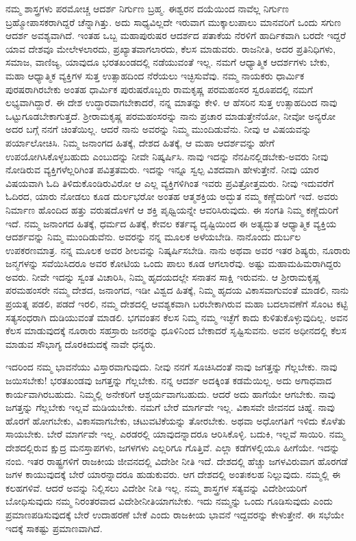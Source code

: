 ನಮ್ಮ ಶಾಸ್ತ್ರಗಳು ಪರಮೋಚ್ಚ ಆದರ್ಶ ನಿರ್ಗುಣ ಬ್ರಹ್ಮ. ಈಶ್ವರನ ದಯೆಯಿಂದ ನಾವೆಲ್ಲ ನಿರ್ಗುಣ ಬ್ರಹ್ಮೋಪಾಸಕರಾಗಿದ್ದರೆ ಚೆನ್ನಾಗಿತ್ತು. ಅದು ಸಾಧ್ಯವಿಲ್ಲದೇ ಇರುವಾಗ ಮುಕ್ಕಾಲುಪಾಲು ಮಾನವರಿಗೆ ಒಂದು ಸಗುಣ ಆದರ್ಶ ಅವಶ್ಯವಾಗಿದೆ. ಇಂತಹ ಒಬ್ಬ ಮಹಾಪುರುಷರ ಆದರ್ಶದ ಪತಾಕೆಯ ನೆರಳಿಗೆ ಹಾರ್ದಿಕವಾಗಿ ಬರದೇ ಇದ್ದರೆ ಯಾವ ದೇಶವೂ ಮೇಲೇಳಲಾರದು, ಪ್ರಖ್ಯಾತವಾಗಲಾರದು, ಕೆಲಸ ಮಾಡುವರು. ರಾಜನೀತಿ, ಅದರ ಪ್ರತಿನಿಧಿಗಳು, ಸಮಾಜ, ವಾಣಿಜ್ಯ, ಯಾವುದೂ ಭರತಖಂಡದಲ್ಲಿ ನಡೆಯುವಂತೆ ಇಲ್ಲ. ನಮಗೆ ಆಧ್ಯಾತ್ಮಿಕ ಆದರ್ಶಗಳು ಬೇಕು, ಮಹಾ ಆಧ್ಯಾತ್ಮಿಕ ವ್ಯಕ್ತಿಗಳ ಸುತ್ತ ಉತ್ಸಾಹದಿಂದ ನೆರೆಯಲು ಇಚ್ಛಿಸುವೆವು. ನಮ್ಮ ನಾಯಕರು ಧಾರ್ಮಿಕ ಪುರಷರಾಗಿರಬೇಕು ಅಂತಹ ಧಾರ್ಮಿಕ ಪುರುಷರೊಬ್ಬರು ರಾಮಕೃಷ್ಣ ಪರಮಹಂಸರ ಸ್ವರೂಪದಲ್ಲಿ ನಮಗೆ ಲಭ್ಯವಾಗಿದ್ದಾರೆ. ಈ ದೇಶ ಉದ್ಧಾರವಾಗಬೇಕಾದರೆ, ನನ್ನ ಮಾತನ್ನು ಕೇಳಿ. ಆ ಹೆಸರಿನ ಸುತ್ತ ಉತ್ಸಾಹದಿಂದ ನಾವು ಒಟ್ಟುಗೂಡಬೇಕಾಗುತ್ತದೆ. ಶ‍್ರೀರಾಮಕೃಷ್ಣ ಪರಮಹಂಸರನ್ನು ನಾನು ಪ್ರಚಾರ ಮಾಡುತ್ತೇನೆಯೋ, ನೀವೋ ಅನ್ಯರೋ ಅದರ ಬಗ್ಗೆ ನನಗೆ ಚಿಂತೆಯಿಲ್ಲ. ಆದರೆ ನಾನು ಅವರನ್ನು ನಿಮ್ಮ ಮುಂದಿಡುವೆನು. ನೀವು ಆ ವಿಷಯವನ್ನು ಪರ್ಯಾಲೋಚಿಸಿ. ನಿಮ್ಮ ಜನಾಂಗದ ಹಿತಕ್ಕೆ, ದೇಶದ ಹಿತಕ್ಕೆ, ಆ ಮಹಾ ಆದರ್ಶವನ್ನು ಹೇಗೆ ಉಪಯೋಗಿಸಿಕೊಳ್ಳಬಹುದು ಎಂಬುದನ್ನು ನೀವೇ ನಿಷ್ಕರ್ಷಿಸಿ. ನಾವು ಇದನ್ನು ನೆನಪಿನಲ್ಲಿಡಬೇಕು-ಅವರು ನೀವು ನೋಡಿರುವ ವ್ಯಕ್ತಿಗಳೆಲ್ಲರಿಗಿಂತ ಪವಿತ್ರತಮರು. ಇದನ್ನು ಇನ್ನೂ ಸ್ವಲ್ಪ ವಿಶದವಾಗಿ ಹೇಳುತ್ತೇನೆ. ನೀವು ಯಾರ ವಿಷಯವಾಗಿ ಓದಿ ತಿಳಿದುಕೊಂಡಿರುವಿರೋ ಆ ಎಲ್ಲ ವ್ಯಕ್ತಿಗಳಿಗಿಂತ ಇವರು ಪ್ರವಿತ್ರೋತ್ತಮರು. ನೀವು ಇದುವರೆಗೆ ಓದಿರದ, ಯಾರು ನೋಡಲು ಕೂಡ ದುರ್ಲಭರೋ ಅಂತಹ ಆತ್ಮಶಕ್ತಿಯ ಅದ್ಭುತ ನಮ್ಮ ಕಣ್ಣೆದುರಿಗೆ ಇದೆ. ಅವರು ನಿರ್ಮಾಣ ಹೊಂದಿದ ಹತ್ತು ವರುಷದೊಳಗೆ ಆ ಶಕ್ತಿ ಪೃಥ್ವಿಯನ್ನೇ ಆವರಿಸಿರುವುದು. ಈ ಸಂಗತಿ ನಿಮ್ಮ ಕಣ್ಣೆದುರಿಗೆ ಇದೆ. ನಮ್ಮ ಜನಾಂಗದ ಹಿತಕ್ಕೆ, ಧರ್ಮದ ಹಿತಕ್ಕೆ, ಕೇವಲ ಕರ್ತವ್ಯ ದೃಷ್ಟಿಯಿಂದ ಈ ಅತ್ಯದ್ಭುತ ಆಧ್ಯಾತ್ಮಿಕ ವ್ಯಕ್ತಿಯ ಆದರ್ಶವನ್ನು ನಿಮ್ಮ ಮುಂದಿಡುವೆನು. ಅವರನ್ನು ನನ್ನ ಮೂಲಕ ಅಳೆಯಬೇಡಿ. ನಾನೊಂದು ದುರ್ಬಲ ಉಪಕರಣಮಾತ್ರ. ನನ್ನ ಮೂಲಕ ಅವರ ಶೀಲವನ್ನು ನಿಷ್ಕರ್ಷಿಸಬೇಡಿ. ನಾನು ಅಥವಾ ಅವರ ಇತರ ಶಿಷ್ಯರು, ನೂರಾರು ಜನ್ಮಗಳನ್ನು ಸವೆಯಿಸಿದರೂ ಅವರ ಕೋಟಿಯ ಒಂದು ಪಾಲು ಕೂಡ ಆಗಲಾರೆವು. ಅಷ್ಟು ಮಹಾಮಹಿಮರಾಗಿದ್ದರು ಅವರು. ನೀವೇ ಇದನ್ನು ಸ್ವಂತ ವಿಚಾರಿಸಿ, ನಿಮ್ಮ ಹೃದಯದಲ್ಲೇ ಸನಾತನ ಸಾಕ್ಷಿ ಇರುವನು. ಆ ಶ‍್ರೀರಾಮಕೃಷ್ಣ ಪರಮಹಂಸರೇ ನಮ್ಮ ದೇಶದ, ಜನಾಂಗದ, ಇಡೀ ವಿಶ್ವದ ಹಿತಕ್ಕೆ, ನಿಮ್ಮ ಹೃದಯ ವಿಕಾಸವಾಗುವಂತೆ ಮಾಡಲಿ, ನಾನು ಪ್ರಯತ್ನ ಪಡಲಿ, ಪಡದೆ ಇರಲಿ, ನಮ್ಮ ದೇಶದಲ್ಲಿ ಆವಶ್ಯಕವಾಗಿ ಬರಬೇಕಾಗಿರುವ ಮಹಾ ಬದಲಾವಣೆಗೆ ಸೊಂಟ ಕಟ್ಟಿ ಸತ್ಯಸಂಧರಾಗಿ ದುಡಿಯುವಂತೆ ಮಾಡಲಿ. ಭಗವಂತನ ಕೆಲಸ ನಿಮ್ಮ ನಮ್ಮ ಇಚ್ಛೆಗೆ ಕಾದು ಕುಳಿತುಕೊಳ್ಳುವುದಿಲ್ಲ. ಅವನ ಕೆಲಸ ಮಾಡುವುದಕ್ಕೆ ನೂರಾರು ಸಹಸ್ರಾರು ಜನರನ್ನು ಧೂಳಿನಿಂದ ಬೇಕಾದರೆ ಸೃಷ್ಟಿಸುವನು. ಅವನ ಅಧೀನದಲ್ಲಿ ಕೆಲಸ ಮಾಡುವ ಸೌಭಾಗ್ಯ ದೊರಕಿದುದಕ್ಕೆ ನಾವೇ ಧನ್ಯರು.

ಇದರಿಂದ ನಮ್ಮ ಭಾವನೆಯು ವಿಸ್ತಾರವಾಗುವುದು. ನೀವು ನನಗೆ ಸೂಚಿಸಿದಂತೆ ನಾವು ಜಗತ್ತನ್ನು ಗೆಲ್ಲಬೇಕು. ನಾವು ಜಯಿಸಬೇಕು! ಭರತಖಂಡವು ಜಗತ್ತನ್ನು ಗೆಲ್ಲಬೇಕು. ನನ್ನ ಆದರ್ಶ ಅದಕ್ಕಿಂತ ಕಡಮೆಯಿಲ್ಲ. ಅದು ಅಗಾಧವಾದ ಕಾರ್ಯವಾಗಿರಬಹುದು. ನಿಮ್ಮಲ್ಲಿ ಅನೇಕರಿಗೆ ಆಶ್ಚರ್ಯವಾಗಬಹುದು. ಆದರೆ ಅದು ಹಾಗೆಯೇ ಆಗಬೇಕು. ನಾವು ಜಗತ್ತನ್ನು ಗೆಲ್ಲಬೇಕು ಇಲ್ಲವೆ ಮಡಿಯಬೇಕು. ನಮಗೆ ಬೇರೆ ಮಾರ್ಗವೇ ಇಲ್ಲ. ವಿಕಾಸವೇ ಜೀವನದ ಚಿಹ್ನೆ. ನಾವು ಹೊರಗೆ ಹೋಗಬೇಕು, ವಿಕಾಸವಾಗಬೇಕು, ಚಟುವಟಿಕೆಯನ್ನು ತೋರಬೇಕು. ಅಥವಾ ಅಧೋಗತಿಗೆ ಇಳಿದು ಕೊಳೆತು ಸಾಯಬೇಕು. ಬೇರೆ ಮಾರ್ಗವೇ ಇಲ್ಲ. ಎರಡರಲ್ಲಿ ಯಾವುದನ್ನಾದರೂ ಆರಿಸಿಕೊಳ್ಳಿ. ಬದುಕಿ, ಇಲ್ಲವೆ ಸಾಯಿರಿ. ನಮ್ಮ ದೇಶದಲ್ಲಿರುವ ಕ್ಷುದ್ರ ಮನಸ್ತಾಪಗಳು, ಜಗಳಗಳು ಎಲ್ಲರಿಗೂ ಗೊತ್ತಿವೆ. ಎಲ್ಲಾ ಕಡೆಗಳಲ್ಲಿಯೂ ಹೀಗೆಯೇ. ಇದನ್ನು ನಂಬಿ. ಇತರ ರಾಷ್ಟ್ರಗಳಿಗೆ ರಾಜಕೀಯ ಜೀವನದಲ್ಲಿ ವಿದೇಶೀ ನೀತಿ ಇದೆ. ದೇಶದಲ್ಲಿ ಹೆಚ್ಚು ಜಗಳವಿರುವಾಗ ಹೊರಗಡೆ ಜಗಳ ಕಾಯುವುದಕ್ಕೆ ಬೇರೆ ಯಾರನ್ನಾದರೂ ಹುಡುಕುವರು. ಆಗ ದೇಶದಲ್ಲಿ ಅಂತಃಕಲಹ ನಿಲ್ಲುವುದು. ನಮ್ಮಲ್ಲಿ ಈ ಕಲಹಗಳಿವೆ. ಆದರೆ ಅವನ್ನು ನಿಲ್ಲಿಸಲು ವಿದೇಶೀ ನೀತಿ ಇಲ್ಲ. ನಮ್ಮ ಶಾಸ್ತ್ರಗಳ ಸತ್ಯವನ್ನು ವಿದೇಶೀಯರಿಗೆ ಬೋಧಿಸುವುದು ನಮ್ಮ ನಿರಂತರವಾದ ವಿದೇಶೀನೀತಿಯಾಗಬೇಕು. ಇದು ನಮ್ಮನ್ನು ಒಂದು ಗೂಡಿಸುವುದು ಎಂದು ಪ್ರಮಾಣಪಡಿಸುವುದಕ್ಕೆ ಬೇರೆ ಉದಾಹರಣೆ ಬೇಕೆ ಎಂದು ರಾಜಕೀಯ ಭಾವನೆ ಇದ್ದವರನ್ನು ಕೇಳುತ್ತೇನೆ. ಈ ಸಭೆಯೇ ಇದಕ್ಕೆ ಸಾಕಷ್ಟು ಪ್ರಮಾಣವಾಗಿದೆ.

